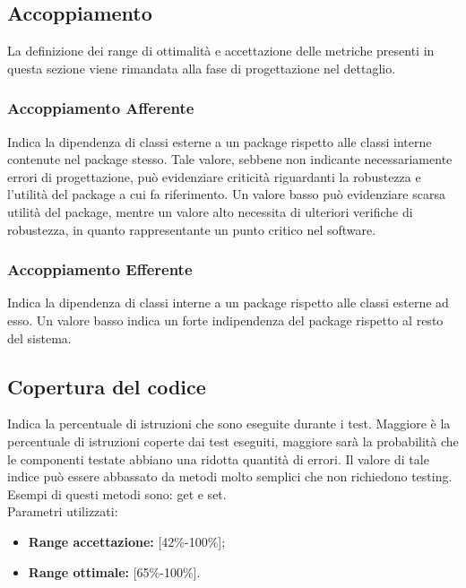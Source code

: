 \subsection{Accoppiamento}
La definizione dei range di ottimalità e accettazione delle metriche presenti in questa sezione viene rimandata alla fase di progettazione nel dettaglio.
\subsubsection{Accoppiamento Afferente}
Indica la dipendenza di classi esterne a un package rispetto alle classi interne contenute nel package stesso.
Tale valore, sebbene non indicante necessariamente errori di progettazione, può evidenziare criticità riguardanti la robustezza e l'utilità del package a cui fa riferimento.
Un valore basso può evidenziare scarsa utilità del package, mentre un valore alto necessita di ulteriori verifiche di robustezza, in quanto rappresentante un punto critico nel software.
\subsubsection{Accoppiamento Efferente}
Indica la dipendenza di classi interne a un package rispetto alle classi esterne ad esso.
Un valore basso indica un forte indipendenza del package rispetto al resto del sistema.

\subsection{Copertura del codice}
Indica la percentuale di istruzioni che sono eseguite durante i test.
Maggiore è la percentuale di istruzioni coperte dai test eseguiti, maggiore sarà la probabilità che le componenti testate abbiano una ridotta quantità di errori.
Il valore di tale indice può essere abbassato da metodi molto semplici che non richiedono testing. Esempi di questi metodi sono: get e set.\\
Parametri utilizzati:

\begin{itemize}
	
	\item \textbf{Range accettazione:} [42\%-100\%];
	\item \textbf{Range ottimale:} [65\%-100\%].
	
\end{itemize}

